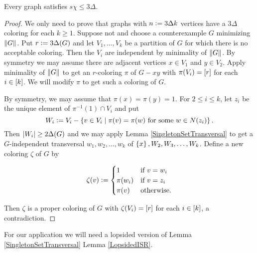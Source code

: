 \begin{thm}\label{StrongColorBound}
Every graph satisfies $s\chi \leq 3\Delta$.
\end{thm}
\begin{proof}
We only need to prove that graphs with $n \mathrel{\mathop:}= 3\Delta k$ vertices have a $3\Delta$ coloring for each $k \geq 1$.  
Suppose not and choose a counterexample $G$ minimizing $\left\Vert G\right\Vert$.  Put $r \mathrel{\mathop:}= 3\Delta(G)$ and let $V_1, \ldots, V_k$ be a partition 
of $G$ for which there is no acceptable coloring.  Then the $V_i$ are independent by minimality of $\left\Vert G\right\Vert$. By symmetry we may assume 
there are adjacent vertices $x \in V_1$ and $y \in V_2$. Apply minimality of $\left\Vert G\right\Vert$ to get an $r$-coloring $\pi$ of $G - xy$ 
with $\pi(V_i) = \left[r\right]$ for each $i \in \left[k\right]$.  We will modify $\pi$ to get such a coloring of $G$.

By symmetry, we may assume that $\pi(x) = \pi(y) = 1$.  For $2 \leq i \leq k$, let $z_i$ be the unique element of $\pi^{-1}(1) \cap V_i$ and 
put 
\[W_i \mathrel{\mathop:}= V_i - \left\{ v \in V_i \mid \pi(v) = \pi(w) \text{ for some } w \in N(z_i) \right\}.\]  
Then $\left|W_i\right| \geq 2\Delta(G)$ and we may apply 
Lemma \ref{SingletonSetTransversal} to get a $G$-independent transversal $w_1, w_2, \ldots, w_k$ of $\left\{ x \right\}, W_2, W_3, \ldots, W_k$.  
Define a new coloring $\zeta$ of $G$ by 


\begin{equation*}
\zeta(v) \mathrel{\mathop:}= 
\begin{cases}
1 & \text{if $v = w_i$} \\
\pi(w_i) & \text{if $v = z_i$} \\
\pi(v) & \text{otherwise.}
\end{cases}
\end{equation*}

\noindent Then $\zeta$ is a proper coloring of $G$ with $\zeta(V_i) = \left[r\right]$ for each $i \in \left[k\right]$, a contradiction.
\end{proof}

For our application we will need a lopsided version of Lemma \ref{SingletonSetTransversal} Lemma \ref{LopsidedISR}.

